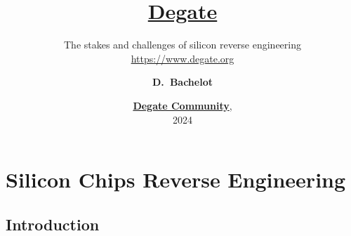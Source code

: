 \documentclass[aspectratio=169]{beamer}
\title{\textbf{\underline{Degate}}}
\subtitle{The stakes and challenges of silicon reverse engineering \\ \url{https://www.degate.org}}
\author{\textbf{D.~Bachelot}}
\date{\textbf{\underline{Degate Community}},\\ 2024}
\begin{document}
	

\begin{frame}[plain]
    \maketitle
\end{frame}


\begin{frame}{}
	\tableofcontents
\end{frame}


\section{Silicon Chips Reverse Engineering}


	\subsection{Introduction}
	
	
	\begin{frame}{}
	\end{frame}
	
\end{document}
